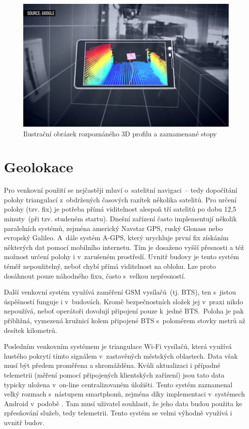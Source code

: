  \begin{figure}
	  \centering
      \includegraphics[width=\textwidth]{img/8-google-tango.png}
      \caption{Ilustrační obrázek rozpoznáného 3D profilu a zaznamenané stopy}
      \label{obr8}
  \end{figure}

\section{Geolokace}\label{geolokace}

Pro venkovní použití se nejčastěji mluví o~satelitní navigaci~-- tedy dopočítání polohy triangulací z~obdržených časových razítek několika satelitů. Pro určení polohy (tzv. fix) je potřeba přímá viditelnost alespoň tří satelitů po dobu 12,5 minuty\cite{zdroj33}~(při tzv. studeném startu). Dnešní zařízení často implementují několik paralelních systémů, zejména americký Navstar GPS, ruský Glonass nebo evropský Galileo. A~dále systém A-GPS, který urychluje první fix získáním některých dat pomocí mobilního internetu. Tím je dosaženo vyšší přesnosti a též možnost určení polohy i v~zarušeném prostředí. Uvnitř budovy je tento systém téměř nepoužitelný, neboť chybí přímá viditelnost na oblohu. Lze proto dosáhnout pouze náhodného fixu, často s~velkou nepřesností.

Další venkovní systém využívá zaměření GSM vysílačů~(tj. BTS), ten s~jistou úspěšností funguje i v~budovách. Kromě bezpečnostních složek jej v~praxi nikdo nepoužívá, neboť operátoři dovolují připojení pouze k~jedné BTS.~Poloha je pak přibližná, vymezená kružnicí kolem připojené BTS s~poloměrem stovky metrů až desítek kilometrů.

Posledním venkovním systémem je triangulace Wi-Fi vysílačů\cite{zdroj34}, která využívá hustého pokrytí tímto signálem v~zastavěných městských oblastech. Data však musí být předem proměřena a shromážděna. Kvůli aktualizaci i případné telemetrii (měření pomocí připojených klientských zařízení) jsou tato data typicky uložena v~on-line centralizovaném úložišti. Tento systém zaznamenal velký rozmach s~nástupem smartphonů, zejména díky implementaci v~systémech Android v~podobě . Tam musí uživatel souhlasit, že jeho data budou použita ke zpřesňování služeb, tedy telemetrii. Tento systém se velmi výhodně využívá i uvnitř budov.

